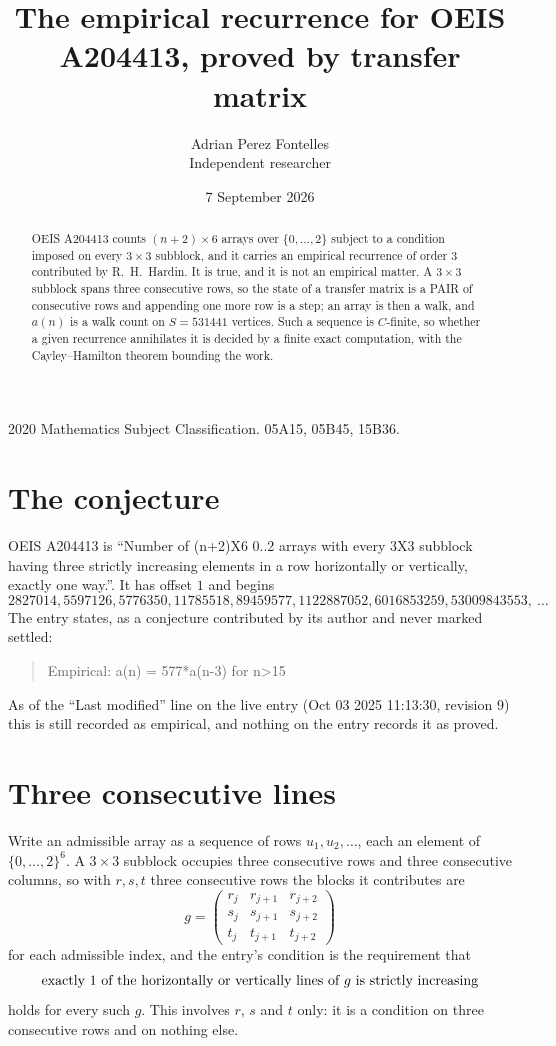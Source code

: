 \documentclass[11pt,a4paper]{article}
\title{The empirical recurrence for OEIS A204413, proved by transfer matrix}
\author{Adrian Perez Fontelles\\ \small Independent researcher}
\date{7 September 2026}
\theoremstyle{plain}
\theoremstyle{definition}
\begin{document}
\maketitle

\begin{abstract}
OEIS A204413 counts $(n+2)\times6$ arrays over $\{0,\dots,2\}$ subject to a condition imposed on
every $3\times3$ subblock, and it carries an empirical recurrence of order $3$
contributed by R.~H.~Hardin. It is true, and it is not an empirical matter. A $3\times3$
subblock spans three consecutive rows, so the state of a transfer matrix is a PAIR of
consecutive rows and appending one more row is a step; an array is then a walk, and
$a(n)$ is a walk count on $S=531441$ vertices. Such a sequence is $C$-finite, so whether a given
recurrence annihilates it is decided by a finite exact computation, with the Cayley--Hamilton
theorem bounding the work.
\end{abstract}

\noindent\small 2020 Mathematics Subject Classification. 05A15, 05B45, 15B36.\normalsize

\section{The conjecture}

OEIS A204413 is ``Number of (n+2)X6 0..2 arrays with every 3X3 subblock having three strictly increasing elements in a row horizontally or vertically, exactly one way.''. It has offset $1$ and begins
\[
2827014, 5597126, 5776350, 11785518, 89459577, 1122887052, 6016853259, 53009843553,\ \dots
\]
The entry states, as a conjecture contributed by its author and never marked settled:
\begin{quote}
Empirical: a(n) = 577*a(n-3) for n>15
\end{quote}
As of the ``Last modified'' line on the live entry (Oct 03 2025 11:13:30, revision 9) this is still
recorded as empirical, and nothing on the entry records it as proved.

\section{Three consecutive lines}

Write an admissible array as a sequence of rows $u_1,u_2,\dots$, each an element of
$\{0,\dots,2\}^{6}$. A $3\times3$ subblock occupies three consecutive rows and
three consecutive columns, so with $r,s,t$ three consecutive rows the blocks it
contributes are
\[
g=\begin{pmatrix}r_j&r_{j+1}&r_{j+2}\\ s_j&s_{j+1}&s_{j+2}\\ t_j&t_{j+1}&t_{j+2}\end{pmatrix}
\]
for each admissible index, and the entry's condition is the requirement that
\[
\text{exactly }1\text{ of the horizontally or vertically lines of }g\text{ \text{is strictly increasing}}
\]
holds for every such $g$. This involves $r$, $s$ and $t$ only: it is a condition on
three consecutive rows and on nothing else.
\end{document}
